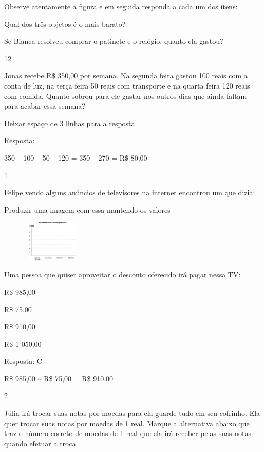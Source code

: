 Observe atentamente a figura e em seguida responda a cada um dos itens:

\begin{escolha}

\item
  Qual dos três objetos é o mais barato?

\item
  Se Bianca resolveu comprar o patinete e o relógio, quanto ela gastou?

\num{12}

Jonas recebe R\$ 350,00 por semana. Na segunda feira gastou 100 reais
com a conta de luz, na terça feira 50 reais com transporte e na quarta
feira 120 reais com comida. Quanto sobrou para ele gastar nos outros
dias que ainda faltam para acabar essa semana?

Deixar espaço de 3 linhas para a resposta

Resposta:

350 -- 100 -- 50 -- 120 = 350 -- 270 = R\$ 80,00


\num{1}

Felipe vendo alguns anúncios de televisores na internet encontrou um que
dizia:

Produzir uma imagem com essa mantendo os valores

\includegraphics[width=1.95850in,height=0.77507in]{media/image81.png}

Uma pessoa que quiser aproveitar o desconto oferecido irá pagar nessa
TV:

\begin{escolha}

\item
  R\$ 985,00
\item
  R\$ 75,00
\item
  R\$ 910,00
\item
  R\$ 1 050,00
\end{escolha}

Resposta: C

R\$ 985,00 -- R\$ 75,00 = R\$ 910,00

\num{2}

Júlia irá trocar suas notas por moedas para ela guarde tudo em seu
cofrinho. Ela quer trocar suas notas por moedas de 1 real. Marque a
alternativa abaixo que traz o número correto de moedas de 1 real que ela
irá receber pelas suas notas quando efetuar a troca.


\end{escolha}
